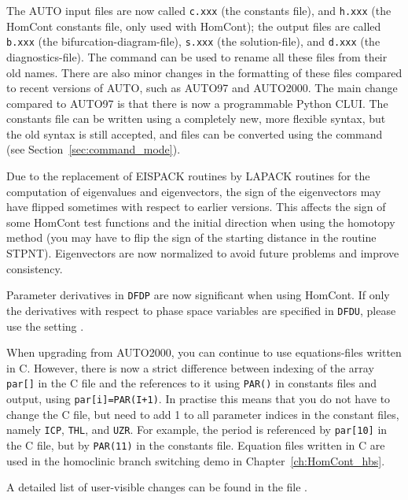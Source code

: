 \documentclass[12pt]{report}
\begin{document}
The {\cal AUTO} input files are now called 
{\tt c.xxx} (the constants file),
and
{\tt h.xxx} (the {\cal HomCont} constants file, only used with {\cal HomCont});
the output files are called
{\tt b.xxx} (the bifurcation-diagram-file),
{\tt s.xxx} (the solution-file),
and
{\tt d.xxx} (the diagnostics-file).
The command  can be used to rename all these files from
their old names.
There are also minor changes in the formatting of these files 
compared to recent versions of {\cal AUTO}, such as {\cal AUTO97} 
and {\cal AUTO2000}.
The main change compared to {\cal AUTO97} is that there is now a
programmable Python CLUI. The constants file can be written using
a completely new, more flexible syntax, but the old syntax is
still accepted, and files can be converted using the command
 (see Section~\ref{sec:command_mode}).

Due to the replacement of EISPACK routines by LAPACK routines for the
computation of eigenvalues and eigenvectors, the sign of the
eigenvectors may have flipped sometimes with respect to earlier
versions. This affects the sign of some {\cal HomCont}
test functions and the initial direction when using the homotopy
method (you may have to flip the sign of the starting distance
in the routine STPNT). Eigenvectors are now normalized to avoid
future problems and improve consistency.

Parameter derivatives in {\tt DFDP} are now significant when using {\cal
HomCont}. If only the derivatives with respect to phase space variables
are specified in {\tt DFDU}, please use the setting .

When upgrading from {\cal AUTO2000}, you can continue to use
equations-files written in C. However, there is now a strict
difference between indexing of the array {\tt par[]} in the
C file and the references to it using {\tt PAR()} in constants
files and output, using {\tt par[i]=PAR(I+1)}. In practise this
means that you do not have to change the C file, but need to
add 1 to all parameter indices in the constant files, namely
{\tt ICP}, {\tt THL}, and {\tt UZR}. For example,
the period is referenced by {\tt par[10]} in the C file,
but by {\tt PAR(11)} in the constants file. Equation files
written in C are used in the homoclinic branch switching
demo in Chapter~\ref{ch:HomCont_hbs}.
 
A detailed list of user-visible changes can be found in the file
.
\end{document}
